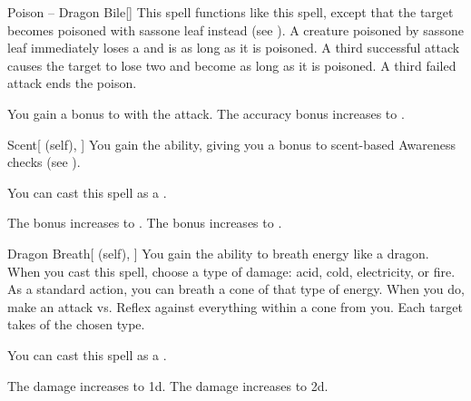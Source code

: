 \lowercase{\hypertarget{spell:Poison -- Dragon Bile}{}}\label{spell:Poison -- Dragon Bile}
\begin{freeability}[Rank 3]{\hypertarget{spell:Poison -- Dragon Bile}{Poison -- Dragon Bile}}[]
This spell functions like this  spell, except that the target becomes poisoned with sassone leaf instead (see ).
A creature poisoned by sassone leaf immediately loses a  and is  as long as it is poisoned.
A third successful attack causes the target to lose two  and become  as long as it is poisoned.
A third failed attack ends the poison.

\rankline
{} You gain a  bonus to  with the attack.
 The accuracy bonus increases to .
\end{freeability}
\vspace{0.25em}



\lowercase{\hypertarget{spell:Scent}{}}\label{spell:Scent}
\begin{attuneability}[Rank 3]{\hypertarget{spell:Scent}{Scent}}[ (self), ]
You gain the  ability, giving you a  bonus to scent-based Awareness checks (see ).

You can cast this spell as a .

\rankline
{} The bonus increases to .
 The bonus increases to .
\end{attuneability}
\vspace{0.25em}



\lowercase{\hypertarget{spell:Dragon Breath}{}}\label{spell:Dragon Breath}
\begin{attuneability}[Rank 4]{\hypertarget{spell:Dragon Breath}{Dragon Breath}}[ (self), ]
You gain the ability to breath energy like a dragon.
When you cast this spell, choose a type of damage: acid, cold, electricity, or fire.
As a standard action, you can breath a cone of that type of energy.
When you do, make an attack vs. Reflex against everything within a \arealarge cone from you.
\hit Each target takes  of the chosen type.

You can cast this spell as a .

\rankline
{} The damage increases to  \plus1d.
 The damage increases to  \plus2d.
\end{attuneability}
\vspace{0.25em}



